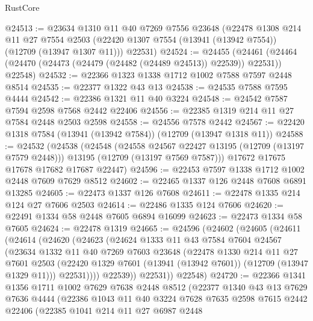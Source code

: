 \begin{lexlean}{RustCore}
\begin{coremodule}
@24513 := @23634
    @1310
    @11
    @40
    @7269
    @7556
    @23648
    (@22478
      @1308
      @214
      @11
      @27
      @7554
      @2503
      (@22420 @1307 @7554 (@13941 (@13942 @7554)) (@12709 (@13947 @1307 @11)))
      @22531)
@24524 := @24455
    (@24461 (@24464 (@24470 (@24473 (@24479 (@24482 (@24489 @24513)) @22539)) @22531)) @22548)
@24532 := @22366 @1323 @1338 @1712 @1002 @7588 @7597 @2448 @8514
@24535 := @22377 @1322 @43 @13
@24538 := @24535 @7588 @7595 @4444
@24542 := @22386 @1321 @11 @40 @3224
@24548 := @24542 @7587 @7594 @2598 @7568 @2442 @22406
@24556 := @22385 @1319 @214 @11 @27 @7584 @2448 @2503 @2598
@24558 := @24556 @7578 @2442
@24567 := @22420 @1318 @7584 (@13941 (@13942 @7584)) (@12709 (@13947 @1318 @11))
@24588 := @24532
    (@24538
      (@24548
        (@24558 @24567 @22427 @13195 (@12709 (@13197 @7579 @2448)))
        @13195
        (@12709 (@13197 @7569 @7587)))
      @17672
      @17675
      @17678
      @17682
      @17687
      @22447)
@24596 := @22453 @7597 @1338 @1712 @1002 @2448 @7609 @7629 @8512
@24602 := @22465 @1337 @126 @2448 @7608 @6891 @13285
@24605 := @22473 @1337 @126 @7608
@24611 := @22478 @1335 @214 @124 @27 @7606 @2503
@24614 := @22486 @1335 @124 @7606
@24620 := @22491 @1334 @58 @2448 @7605 @6894 @16099
@24623 := @22473 @1334 @58 @7605
@24624 := @22478 @1319
@24665 := @24596
    (@24602
      (@24605
        (@24611
          (@24614
            (@24620
              (@24623
                (@24624
                  @1333
                  @11
                  @43
                  @7584
                  @7604
                  @24567
                  (@23634
                    @1332
                    @11
                    @40
                    @7269
                    @7603
                    @23648
                    (@22478
                      @1330
                      @214
                      @11
                      @27
                      @7601
                      @2503
                      (@22420 @1329 @7601 (@13941 (@13942 @7601)) (@12709 (@13947 @1329 @11)))
                      @22531))))
              @22539))
          @22531))
      @22548)
@24720 := @22366
    @1341
    @1356
    @1711
    @1002
    @7629
    @7638
    @2448
    @8512
    (@22377
      @1340
      @43
      @13
      @7629
      @7636
      @4444
      (@22386
        @1043
        @11
        @40
        @3224
        @7628
        @7635
        @2598
        @7615
        @2442
        @22406
        (@22385
          @1041
          @214
          @11
          @27
          @6987
          @2448

\end{coremodule}
\end{lexlean}
